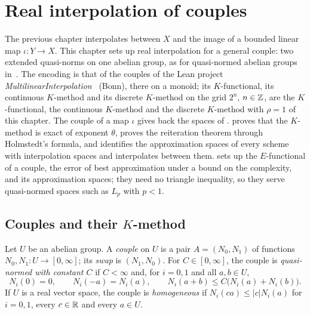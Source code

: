 \chapter{Real interpolation of couples}
\label{ch:real-interpolation}

The previous chapter interpolates between $X$ and the image of a bounded linear map
$\iota : Y \to X$. This chapter sets up real interpolation for a general couple: two extended
quasi-norms on one abelian group, as for quasi-normed abelian groups
in~\cite[Sections~3.10 and~3.11]{BerghLofstrom}. The encoding is that of the couples of the Lean
project \emph{MultilinearInterpolation}~\cite{MultilinearInterpolation} (Bonn), there on a
monoid; its $K$-functional, its
continuous $K$-method and its discrete $K$-method on the grid $2^n$, $n \in \mathbb{Z}$, are the
$K$-functional, the continuous $K$-method and the discrete $K$-method with $\rho = 1$ of this
chapter. The couple of a map $\iota$ gives back the spaces of
.  proves that the $K$-method is exact
of exponent $\theta$,  proves the reiteration theorem through
Holmstedt's formula, and  identifies the
approximation spaces of every scheme with interpolation spaces and interpolates between them.
 sets up the $E$-functional of a couple, the error of best approximation
under a bound on the complexity, and its approximation spaces; they need no triangle inequality,
so they serve quasi-normed spaces such as $L_p$ with $p < 1$.

\section{Couples and their \texorpdfstring{$K$}{K}-method}
\label{sec:couples}

\begin{definition}[Couple]
\label{def:couple}
\leanok
Let $U$ be an abelian group. A \emph{couple} on $U$ is a pair $A = (N_0, N_1)$ of functions
$N_0, N_1 : U \to [0, \infty]$; its \emph{swap} is $(N_1, N_0)$. For $C \in [0, \infty]$, the
couple is \emph{quasi-normed with constant $C$} if $C < \infty$ and, for $i = 0, 1$ and all
$a, b \in U$,
\[
  N_i(0) = 0 , \qquad N_i(-a) = N_i(a) , \qquad N_i(a + b) \leq C \bigl(N_i(a) + N_i(b)\bigr) .
\]
If $U$ is a real vector space, the couple is \emph{homogeneous} if $N_i(c a) \leq |c| N_i(a)$
for $i = 0, 1$, every $c \in \mathbb{R}$ and every $a \in U$.
\end{definition}

